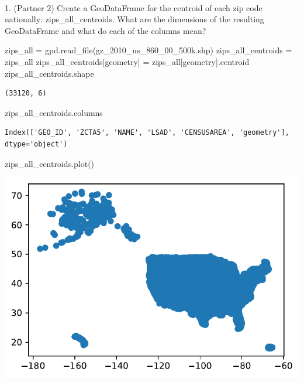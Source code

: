 \documentclass[
  letterpaper,
  DIV=11,
  numbers=noendperiod]{scrartcl}
\makeatletter
\let\oldparagraph\paragraph
\renewcommand{\paragraph}{
    \@ifstar
      \xxxParagraphStar
      \xxxParagraphNoStar
  }
\newcommand{\xxxParagraphStar}[1]{\oldparagraph*{#1}\mbox{}}
\newcommand{\xxxParagraphNoStar}[1]{\oldparagraph{#1}\mbox{}}
\newenvironment{Shaded}{\begin{snugshade}}{\end{snugshade}}
\newcommand{\NormalTok}[1]{\textcolor[rgb]{0.00,0.23,0.31}{#1}}
\newcommand{\OperatorTok}[1]{\textcolor[rgb]{0.37,0.37,0.37}{#1}}
\newcommand{\StringTok}[1]{\textcolor[rgb]{0.13,0.47,0.30}{#1}}
\makeatother
\begin{document}
\paragraph{1. (Partner 2) Create a GeoDataFrame for the centroid of each
zip code nationally: zips\_all\_centroids. What are the dimensions of
the resulting GeoDataFrame and what do each of the columns
mean?}\label{partner-2-create-a-geodataframe-for-the-centroid-of-each-zip-code-nationally-zips_all_centroids.-what-are-the-dimensions-of-the-resulting-geodataframe-and-what-do-each-of-the-columns-mean}

\begin{Shaded}
\begin{Highlighting}[]
\NormalTok{zips\_all }\OperatorTok{=}\NormalTok{ gpd.read\_file(}\StringTok{\textquotesingle{}gz\_2010\_us\_860\_00\_500k.shp\textquotesingle{}}\NormalTok{)}
\NormalTok{zips\_all\_centroids }\OperatorTok{=}\NormalTok{ zips\_all}
\NormalTok{zips\_all\_centroids[}\StringTok{\textquotesingle{}geometry\textquotesingle{}}\NormalTok{] }\OperatorTok{=}\NormalTok{ zips\_all[}\StringTok{\textquotesingle{}geometry\textquotesingle{}}\NormalTok{].centroid}
\NormalTok{zips\_all\_centroids.shape}
\end{Highlighting}
\end{Shaded}

\begin{verbatim}
(33120, 6)
\end{verbatim}

\begin{Shaded}
\begin{Highlighting}[]
\NormalTok{zips\_all\_centroids.columns}
\end{Highlighting}
\end{Shaded}

\begin{verbatim}
Index(['GEO_ID', 'ZCTA5', 'NAME', 'LSAD', 'CENSUSAREA', 'geometry'], dtype='object')
\end{verbatim}

\begin{Shaded}
\begin{Highlighting}[]
\NormalTok{zips\_all\_centroids.plot()}
\end{Highlighting}
\end{Shaded}

\includegraphics{ps4_files/figure-pdf/cell-20-output-1.pdf}
\end{document}
